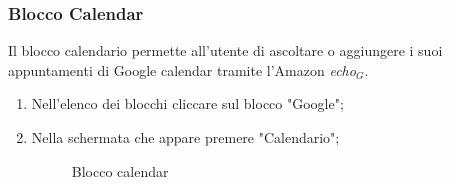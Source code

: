 \subsubsection{Blocco Calendar}
Il blocco calendario permette all'utente di ascoltare o aggiungere i suoi appuntamenti di Google calendar tramite l'Amazon \textit{echo$_{G}$}.
\begin{enumerate}
	\item Nell'elenco dei blocchi cliccare sul blocco "Google";
	\item Nella schermata che appare premere "Calendario";
	\begin{figure}[!ht]
		\centering
		\caption{Blocco calendar}

\end{figure}
\end{enumerate}
